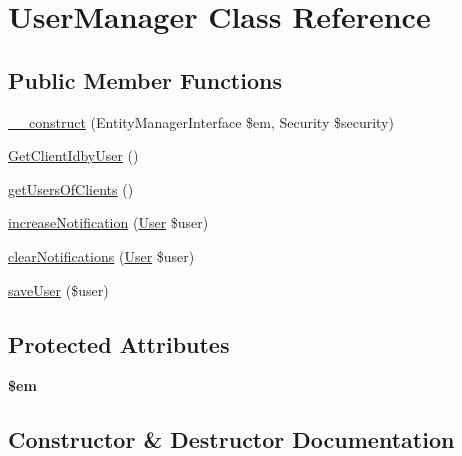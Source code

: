 \hypertarget{class_app_1_1_b_l_1_1_user_manager}{}\section{User\+Manager Class Reference}
\label{class_app_1_1_b_l_1_1_user_manager}
\subsection*{Public Member Functions}
\begin{DoxyCompactItemize}
\item 
\mbox{\hyperlink{class_app_1_1_b_l_1_1_user_manager_a6859870029fd06570270efe4d733eb51}{\+\_\+\+\_\+construct}} (Entity\+Manager\+Interface \$em, Security \$security)
\item 
\mbox{\hyperlink{class_app_1_1_b_l_1_1_user_manager_a0e3604ed403c567a0a006365e2ef5086}{Get\+Client\+Idby\+User}} ()
\item 
\mbox{\hyperlink{class_app_1_1_b_l_1_1_user_manager_a0cefe2180fc2ed5b78a5796ebcce3479}{get\+Users\+Of\+Clients}} ()
\item 
\mbox{\hyperlink{class_app_1_1_b_l_1_1_user_manager_ab44bcaaf98a5da921848e0557b713dd9}{increase\+Notification}} (\mbox{\hyperlink{class_app_1_1_entity_1_1_user}{User}} \$user)
\item 
\mbox{\hyperlink{class_app_1_1_b_l_1_1_user_manager_aeb6054dd936cde532bef888d3b17d928}{clear\+Notifications}} (\mbox{\hyperlink{class_app_1_1_entity_1_1_user}{User}} \$user)
\item 
\mbox{\hyperlink{class_app_1_1_b_l_1_1_user_manager_a0dd4bd96cbcb34ab325f849d2fe3cb5c}{save\+User}} (\$user)
\end{DoxyCompactItemize}
\subsection*{Protected Attributes}
\begin{DoxyCompactItemize}
\item 
\mbox{\label{class_app_1_1_b_l_1_1_user_manager_a0f2991d5fed029ef50ef619f1a532d06}} 
{\bfseries \$em}
\end{DoxyCompactItemize}


\subsection{Constructor \& Destructor Documentation}
\mbox{\label{class_app_1_1_b_l_1_1_user_manager_a6859870029fd06570270efe4d733eb51}} 
